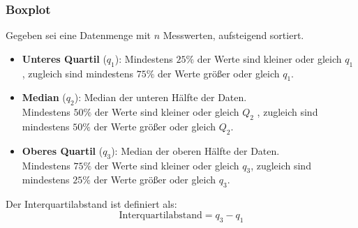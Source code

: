 \subsubsection{Boxplot}
Gegeben sei eine Datenmenge mit $n$ Messwerten, aufsteigend sortiert.  
\begin{itemize}  
  \item \textbf{Unteres Quartil} ($q_1$): Mindestens $25\%$ der Werte sind kleiner oder gleich $q_1$ , zugleich sind mindestens $75\%$ der Werte größer oder gleich $q_1$.
  \item \textbf{Median} ($q_2$): Median der unteren Hälfte der Daten. \\
  Mindestens $50\%$ der Werte sind kleiner oder gleich $Q_2$ , zugleich sind mindestens $50\%$ der Werte größer oder gleich $Q_2$.
  \item \textbf{Oberes Quartil} ($q_3$): Median der oberen Hälfte der Daten. \\
  Mindestens $75\%$ der Werte sind kleiner oder gleich $q_3$, zugleich sind mindestens $25\%$  der Werte größer oder gleich $q_3$.
\end{itemize}  
\noindent
Der Interquartilabstand ist definiert als:
\begin{equation}
\mathrm{Interquartilabstand} = q_3 - q_1
\end{equation}

